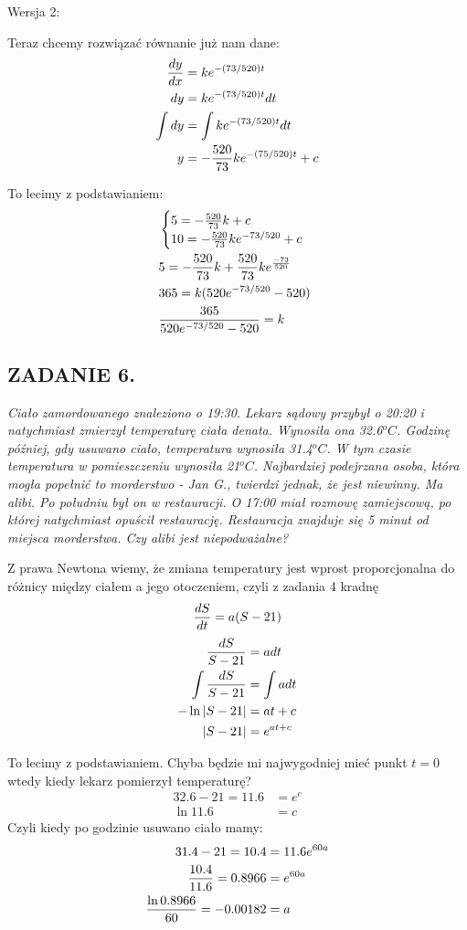 \documentclass{article}
\begin{document}
{\color{dark-green}Wersja 2:}

Teraz chcemy rozwiązać równanie już nam dane:
\begin{align*}
    {dy\over dx}&=ke^{-(73/520) t}\\
    dy&=ke^{-(73/520)t}dt\\
    \int dy&=\int ke^{-(73/520)t}dt\\
    y&=-{520\over 73}ke^{-(75/520)t}+c
\end{align*}

To lecimy z podstawianiem:
\begin{align*}
    &\begin{cases}
        5=-{520\over73}k+c\\
        10=-{520\over73}ke^{-73/520}+c
    \end{cases}\\
    &5=-{520\over73}k+{520\over73}ke^{-73\over520}\\
    &365=k(520e^{-73/520}-520)\\
    &{365\over 520e^{-73/520}-520}=k
\end{align*}

\subsection*{ZADANIE 6.}
\emph{Ciało zamordowanego znaleziono o 19:30. Lekarz sądowy przybył o 20:20 i natychmiast zmierzył temperaturę ciała denata. Wynosiła ona 32.6$^oC$. Godzinę później, gdy usuwano ciało, temperatura wynosiła 31.4$^oC$. W tym czasie temperatura w pomieszczeniu wynosiła 21$^oC$. Najbardziej podejrzana osoba, która mogła popełnić to morderstwo - Jan G., twierdzi jednak, że jest niewinny. Ma alibi. Po południu był on w restauracji. O 17:00 miał rozmowę zamiejscową, po której natychmiast opuścił restaurację. Restauracja znajduje się 5 minut od miejsca morderstwa. Czy alibi jest niepodważalne?}
\smallskip

Z prawa Newtona wiemy, że zmiana temperatury jest wprost proporcjonalna do różnicy między ciałem a jego otoczeniem, czyli z zadania 4 kradnę
$${dS\over dt}=a(S-21)$$
\begin{align*}
    {dS\over S-21}&=adt\\
    \int{dS\over S-21}&=\int adt\\
    -\ln|S-21|&=at+c\\
    |S-21|&=e^{at+c}
\end{align*}

To lecimy z podstawianiem. Chyba będzie mi najwygodniej mieć punkt $t=0$ wtedy kiedy lekarz pomierzył temperaturę?
\begin{align*}
    32.6-21=11.6&=e^c\\
    \ln11.6&=c
\end{align*}
Czyli kiedy po godzinie usuwano ciało mamy:
\begin{align*}
    31.4-21=10.4&=11.6e^{60a}\\
    {10.4\over 11.6}=0.8966&=e^{60a}\\
    {\ln0.8966\over60}=-0.00182&=a
\end{align*}
\end{document}
